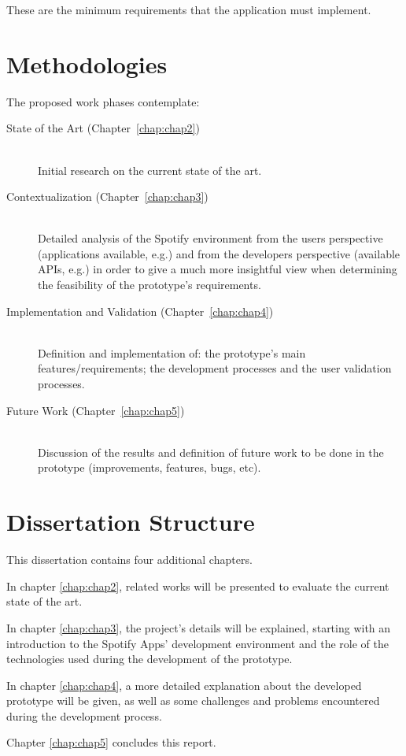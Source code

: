   These are the minimum requirements that the application must implement.


\section{Methodologies} %
\label{sec:methodologies}
  
  The proposed work phases contemplate:

  \begin{description}
    \item[State of the Art (Chapter~\ref{chap:chap2})] \hfill \\
      Initial research on the current state of the art.
    \item[Contextualization (Chapter~\ref{chap:chap3})] \hfill \\
      Detailed analysis of the Spotify environment from the users perspective (applications available, e.g.) and from the developers perspective (available APIs, e.g.) in order to give a much more insightful view when determining the feasibility of the prototype's requirements.
    \item[Implementation and Validation (Chapter~\ref{chap:chap4})] \hfill \\
      Definition and implementation of: the prototype's main features/requirements; the development processes and the user validation processes.
    \item[Future Work (Chapter~\ref{chap:chap5})] \hfill \\
      Discussion of the results and definition of future work to be done in the prototype (improvements, features, bugs, etc).
  \end{description}


\section{Dissertation Structure} \label{sec:struct}

  This dissertation contains four additional chapters.

  In chapter \ref{chap:chap2}, related works will be presented to evaluate the current state of the art.

  In chapter \ref{chap:chap3}, the project's details will be explained, starting with an introduction to the Spotify Apps' development environment and the role of the technologies used during the development of the prototype.

  In chapter \ref{chap:chap4}, a more detailed explanation about the developed prototype will be given, as well as some challenges and problems encountered during the development process.

  Chapter \ref{chap:chap5} concludes this report.
